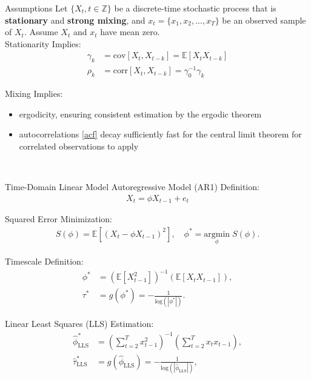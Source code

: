\documentclass[8pt,aspectratio=169]{beamer}
\begin{document}
\begin{frame}{Assumptions}
Let $\{X_t, t\in \mathbb{Z}\}$ be a discrete-time stochastic process that is \textbf{stationary} and \textbf{strong mixing}, and $x_t = \{x_1, x_2, ..., x_T\}$ be an observed sample of $X_t$. Assume $X_t$ and $x_t$ have mean zero.\\
\vfill
Stationarity Implies:
\begin{align}
    \gamma_k &= \text{cov}[X_t, X_{t-k}] = \mathbb{E}[X_t X_{t-k}]\\
    \rho_k &= \text{corr}[X_t, X_{t-k}] = \gamma_0^{-1}\gamma_k\label{acf}
\end{align}

Mixing Implies:
\begin{itemize}
    \item ergodicity, ensuring consistent estimation by the ergodic theorem
    \item autocorrelations \eqref{acf} decay sufficiently fast for the central limit theorem for correlated observations to apply
\end{itemize}
\vfill
\citep{hansen_econometrics_2022, white_nonlinear_1984, newey_simple_1987}\\
\end{frame}

\begin{frame}{Time-Domain Linear Model}
\vfill
Autoregressive Model (AR1) Definition:
\begin{align}
    X_t = \phi X_{t-1} + e_t
\end{align}

Squared Error Minimization:
\begin{align}
    S(\phi) = \mathbb{E}[(X_t - \phi X_{t-1})^2],\quad \phi^* = \underset{\phi}{\text{argmin}} \; S(\phi).
\end{align}

Timescale Definition:
\begin{align}
    \phi^* &= (\mathbb{E}[X_{t-1}^2])^{-1}(\mathbb{E}[X_t X_{t-1}]),\\
    \tau^* &= g(\phi^*) = -\frac{1}{\text{log}(|\phi^*|)}.
\end{align}

Linear Least Squares (LLS) Estimation:
\begin{align}
    \hat\phi^*_{\scriptscriptstyle\text{LLS}} &= \left(\sum_{t=2}^T x_{t-1}^2\right)^{-1} \left(\sum_{t=2}^T x_t x_{t-1}\right),\\
    \hat\tau^*_{\scriptscriptstyle\text{LLS}} &= g(\hat\phi_{\scriptscriptstyle\text{LLS}}) = -\frac{1}{\text{log}(|\hat\phi_{\scriptscriptstyle\text{LLS}}|)},
\end{align}

\end{frame}
\end{document}
